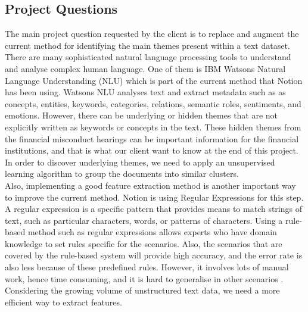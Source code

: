 \documentclass[12pt]{article}
\begin{document}
\subsection{Project Questions}
The main project question requested by the client is to replace and augment the current method for identifying the main themes present within a text dataset. \\

There are many sophisticated natural language processing tools to understand and analyse complex human language. One of them is IBM Watsons Natural Language Understanding (NLU) which is part of the current method that Notion has been using. Watsons NLU analyses text and extract metadata such as as concepts, entities, keywords, categories, relations, semantic roles, sentiments, and emotions. However, there can be underlying or hidden themes that are not explicitly written as keywords or concepts in the text. These hidden themes from the financial misconduct hearings can be important information for the financial institutions, and that is what our client want to know at the end of this project. In order to discover underlying themes, we need to apply an unsupervised learning algorithm to group the documents into similar clusters.\\

Also, implementing a good feature extraction method is another important way to improve the current method. Notion is using Regular Expressions for this step. A regular expression is a specific pattern that provides means to match strings of text, such as particular characters, words, or patterns of characters. Using a rule-based method such as regular expressions allows experts who have domain knowledge to set rules specific for the scenarios. Also, the scenarios that are covered by the rule-based system will provide high accuracy, and the error rate is also less because of these predefined rules. However, it involves lots of manual work, hence time consuming, and it is hard to generalise in other scenarios \cite{JT}. Considering the growing volume of unstructured text data, we need a more efficient way to extract features. \\
\end{document}
